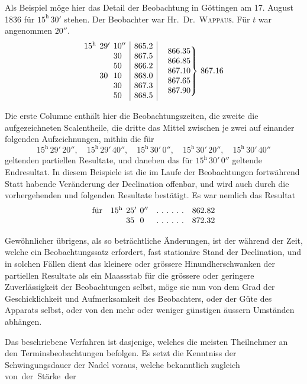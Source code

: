 Als Beispiel möge hier das Detail der Beobachtung in Göttingen am 17. August 1836 für $15^{\mathrm h}\,30'$ stehen. Der Beobachter war Hr.\ Dr.\ \textsc{Wappäus}. Für $t$ war angenommen $20''$.
\begingroup
\renewcommand{\arraystretch}{1.12}
\[
\begin{array}{@{}r@{}l@{\hspace{.40em}}r@{}l@{\hspace{.40em}}r@{}l|r|}
15&{}^{\mathrm h}&29&{}'&10&{}''&865.2\\
&&&&30&&867.5\\
&&&&50&&866.2\\
&&30&&10&&868.0\\
&&&&30&&867.3\\
&&&&50&&868.5
\end{array}
\quad
\left.\begin{array}{@{}r@{}}866.35\\866.85\\867.10\\867.65\\867.90\end{array}\right\}\,867.16
\]
\endgroup

Die erste Columne enthält hier die Beobachtungszeiten, die zweite die aufgezeichneten Scalentheile, die dritte das Mittel zwischen je zwei auf einander folgenden Aufzeichnungen, mithin die für
\[
15^{\mathrm h}\,29'\,20'',\quad15^{\mathrm h}\,29'\,40'',\quad15^{\mathrm h}\,30'\,0'',\quad15^{\mathrm h}\,30'\,20'',\quad15^{\mathrm h}\,30'\,40''
\]
geltenden partiellen Resultate, und daneben das für $15^{\mathrm h}\,30'\,0''$ geltende Endresultat. In diesem Beispiele ist die im Laufe der Beobachtungen fortwährend Statt habende Veränderung der Declination offenbar, und wird auch durch die vorhergehenden und folgenden Resultate bestätigt. Es war nemlich das Resultat
\[
\begin{array}{@{}lr@{}l@{\hspace{.40em}}r@{}l@{\hspace{.40em}}r@{}lll@{}}
\text{für}&15&{}^{\mathrm h}&25&{}'&0&{}''&.\ .\ .\ .\ .\ .&862.82\\
&&&35&&0&&.\ .\ .\ .\ .\ .&872.32
\end{array}
\]

Gewöhnlicher übrigens, als so beträchtliche Änderungen, ist der während der Zeit, welche ein Beobachtungssatz erfordert, fast stationäre Stand der Declination, und in solchen Fällen dient das kleinere oder grössere Hinundherschwanken der partiellen Resultate als ein Maassstab für die grössere oder geringere Zuverlässigkeit der Beobachtungen selbst, möge sie nun von dem Grad der Geschicklichkeit und Aufmerksamkeit des Beobachters, oder der Güte des Apparats selbst, oder von den mehr oder weniger günstigen äussern Umständen abhängen.

Das beschriebene Verfahren ist dasjenige, welches die meisten Theilnehmer an den Terminsbeobachtungen befolgen. Es setzt die Kenntniss der Schwingungsdauer der Nadel voraus, welche bekanntlich zugleich von~der~Stärke~der
